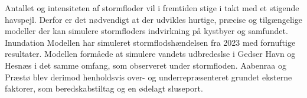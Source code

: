 



Antallet og intensiteten af stormfloder vil i fremtiden stige i takt med et stigende havspejl. Derfor er det nødvendigt at der udvikles hurtige, præcise og tilgængelige modeller der kan simulere stormfloders indvirkning på kystbyer og samfundet.\\
Inundation Modellen har simuleret stormflodshændelsen fra 2023 med fornuftige resultater. Modellen formåede at simulere vandets udbredeslse i Gedser Havn og Hesnæs i det samme omfang, som observeret under stormfloden. Aabenraa og Præstø blev derimod henholdsvis over- og underrepræsenteret grundet eksterne faktorer, som beredskabstiltag og en ødelagt sluseport.  


